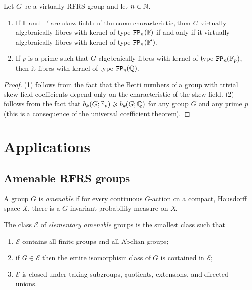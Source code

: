 \documentclass[11pt, letterpaper]{amsart}
\begin{document}
\begin{cor}\label{cor:charac}
    Let $G$ be a virtually RFRS group and let $n \in \mathbb{N}$.
    \begin{enumerate}
        \item If $\mathbb F$ and $\mathbb F'$ are skew-fields of the same characteristic, then $G$ virtually algebraically fibres with kernel of type $\mathtt{FP}_n(\mathbb F)$ if and only if it virtually algebraically fibres with kernel of type $\mathtt{FP}_n(\mathbb F')$.
        \item If $p$ is a prime such that $G$ algebraically fibres with kernel of type $\mathtt{FP}_n(\mathbb F_p)$, then it fibres with kernel of type $\mathtt{FP}_n(\mathbb{Q})$.
    \end{enumerate}
\end{cor}

\begin{proof}
    (1) follows from the fact that the Betti numbers of a group with trivial skew-field coefficients depend only on the characteristic of the skew-field. (2) follows from the fact that $b_k(G; \mathbb F_p) \geqslant b_k(G; \mathbb{Q})$ for any group $G$ and any prime $p$ (this is a consequence of the universal coefficient theorem). \qedhere
\end{proof}



\section{Applications} \label{sec:app}

\subsection{Amenable RFRS groups}

\begin{defn}
A group $G$ is \textit{amenable} if for every continuous $G$-action on a compact, Hausdorff space $X$, there is a $G$-invariant probability measure on $X$.
\end{defn}


\begin{defn} \label{def:elemAm}
The class $\mathcal{E}$ of \textit{elementary amenable} groups is the smallest class such that 
\begin{enumerate}[label = {$\bullet$}]
    \item $\mathcal{E}$ contains all finite groups and all Abelian groups;
    \item if $G \in \mathcal{E}$ then the entire isomorphism class of $G$ is contained in $\mathcal{E}$;
    \item $\mathcal{E}$ is closed under taking subgroups, quotients, extensions, and directed unions.
\end{enumerate}
\end{defn}
\end{document}

